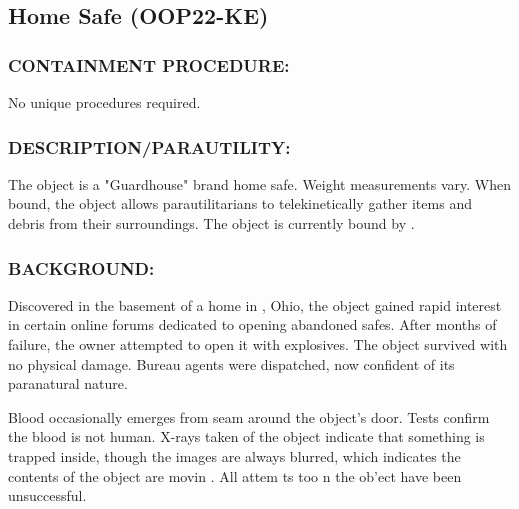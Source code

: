 \subsection*{Home Safe (OOP22-KE)}
\subsubsection*{CONTAINMENT PROCEDURE:}
\par No unique procedures required.
\subsubsection*{DESCRIPTION/PARAUTILITY:}
\par The object is a "Guardhouse" brand
home safe. Weight measurements vary.
When bound, the object allows
parautilitarians to telekinetically gather
items and debris from their surroundings.
The object is currently bound by .
\subsubsection*{BACKGROUND:}
\par Discovered in the basement of a home in 
, Ohio, the object gained rapid interest in certain online forums dedicated to
opening abandoned safes. After months of failure, the owner
attempted to open it with explosives. The object survived with no
physical damage. Bureau agents were dispatched, now confident
of its paranatural nature.
\par Blood occasionally emerges from seam around the object's door.
Tests confirm the blood is not human. X-rays taken of the object
indicate that something is trapped inside, though the images are
always blurred, which indicates the contents of the object are
movin . All attem ts too n the ob'ect have been unsuccessful.